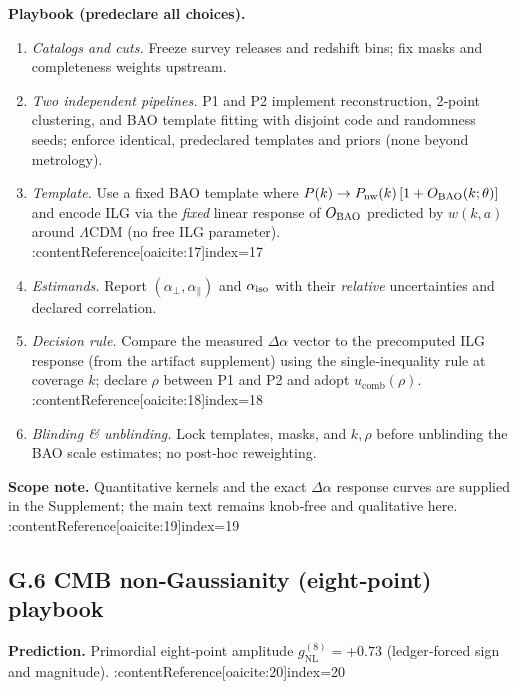 \documentclass[11pt]{article}
\begin{document}
\begin{proposition}
\textbf{Playbook (predeclare all choices).}
\begin{enumerate}
  \item \emph{Catalogs and cuts.} Freeze survey releases and redshift bins; fix masks and completeness weights upstream.
  \item \emph{Two independent pipelines.} P1 and P2 implement reconstruction, 2‑point clustering, and BAO template fitting with disjoint code and randomness seeds; enforce identical, predeclared templates and priors (none beyond metrology).
  \item \emph{Template.} Use a fixed BAO template where $P(k)\to P_{\rm nw}(k)\,[1+O_{\rm BAO}(k;\theta)]$ and encode ILG via the \emph{fixed} linear response of $O_{\rm BAO}$ predicted by $w(k,a)$ around $\Lambda$CDM (no free ILG parameter). :contentReference[oaicite:17]{index=17}
  \item \emph{Estimands.} Report $(\alpha_{\perp},\alpha_{\parallel})$ and $\alpha_{\rm iso}$ with their \emph{relative} uncertainties and declared correlation.
  \item \emph{Decision rule.} Compare the measured $\Delta\alpha$ vector to the precomputed ILG response (from the artifact supplement) using the single‑inequality rule at coverage $k$; declare $\rho$ between P1 and P2 and adopt $u_{\mathrm{comb}}(\rho)$. :contentReference[oaicite:18]{index=18}
  \item \emph{Blinding \& unblinding.} Lock templates, masks, and $k,\rho$ before unblinding the BAO scale estimates; no post‑hoc reweighting.
\end{enumerate}

\textbf{Scope note.} Quantitative kernels and the exact $\Delta\alpha$ response curves are supplied in the Supplement; the main text remains knob‑free and qualitative here. :contentReference[oaicite:19]{index=19}

\medskip

\subsection*{G.6 CMB non‑Gaussianity (eight‑point) playbook}
\textbf{Prediction.} Primordial eight‑point amplitude $g_{\mathrm{NL}}^{(8)}=+0.73$ (ledger‑forced sign and magnitude). :contentReference[oaicite:20]{index=20}


\end{proposition}
\end{document}
